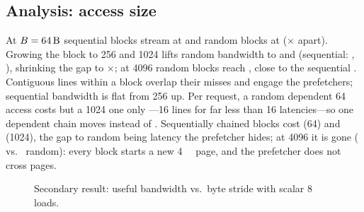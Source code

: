 \subsection{Analysis: access size}
At $B=\qty{64}{\byte}$ sequential blocks stream at  and
random blocks at  ($\times$ apart).
Growing the block to \qty{256}{\byte} and \qty{1024}{\byte} lifts random bandwidth to
 and 
(sequential: , ),
shrinking the gap to $\times$; at \qty{4096}{\byte} random blocks reach
, close to the sequential .
Contiguous lines within a block overlap their misses and engage the prefetchers; sequential bandwidth is
flat from \qty{256}{\byte} up. Per request, a random dependent \qty{64}{\byte} access costs
 but a \qty{1024}{\byte} one only
---16 lines for far less than 16 latencies---so one dependent
chain moves  instead of
. Sequentially chained blocks cost
 (\qty{64}{\byte}) and 
(\qty{1024}{\byte}), the gap to random being latency the prefetcher hides; at \qty{4096}{\byte} it is gone ( vs.\ 
random): every block starts a new \qty{4}{\kibi\byte} page, and the prefetcher does not cross pages.

\begin{figure}[htb]
  \centering
  \caption{Secondary result: useful bandwidth vs.\ byte stride with scalar \qty{8}{\byte} loads.}\label{fig:stride}
\end{figure}

